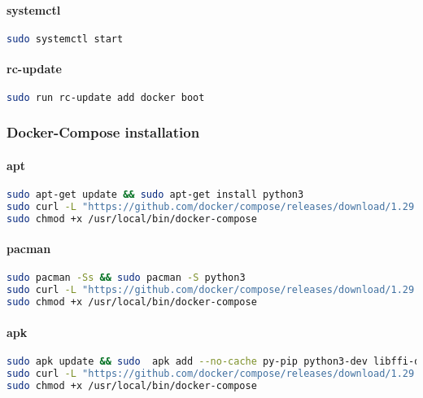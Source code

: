 \paragraph{systemctl}
\begin{lstlisting}[language=bash,label={lst:systemctl-docker}]
sudo systemctl start
\end{lstlisting}

\paragraph{rc-update}
\begin{flushleft}
\begin{lstlisting}[language=bash,label={lst:rc-docker}]
sudo run rc-update add docker boot
\end{lstlisting}
\end{flushleft}

\subsubsection{Docker-Compose installation}
\paragraph{apt}
\begin{flushleft}
\begin{lstlisting}[language=bash,label={lst:apt-compose}]
sudo apt-get update && sudo apt-get install python3
sudo curl -L "https://github.com/docker/compose/releases/download/1.29.2/docker-compose-$(uname -s)-$(uname -m)" -o /usr/local/bin/docker-compose
sudo chmod +x /usr/local/bin/docker-compose
\end{lstlisting}
\end{flushleft}

\paragraph{pacman}
\begin{flushleft}
\begin{lstlisting}[language=bash,label={lst:pacman-compose}]
sudo pacman -Ss && sudo pacman -S python3
sudo curl -L "https://github.com/docker/compose/releases/download/1.29.2/docker-compose-$(uname -s)-$(uname -m)" -o /usr/local/bin/docker-compose
sudo chmod +x /usr/local/bin/docker-compose
\end{lstlisting}
\end{flushleft}

\paragraph{apk}
\begin{flushleft}
\begin{lstlisting}[language=bash,label={lst:apk-compose}]
sudo apk update && sudo  apk add --no-cache py-pip python3-dev libffi-dev openssl-dev gcc libc-dev rust cargo make
sudo curl -L "https://github.com/docker/compose/releases/download/1.29.2/docker-compose-$(uname -s)-$(uname -m)" -o /usr/local/bin/docker-compose
sudo chmod +x /usr/local/bin/docker-compose
\end{lstlisting}
\end{flushleft}


